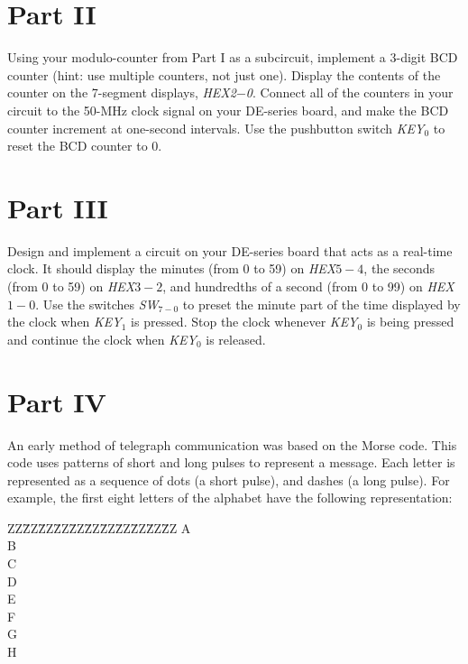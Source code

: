 \documentclass[epsfig,10pt,fullpage]{article}
\begin{document}
\section*{Part II}
Using your modulo-counter from Part I as a subcircuit, 
implement a 3-digit BCD counter (hint: use multiple counters, not just one). Display the 
contents of the counter on the 7-segment displays, {\it HEX2$-$0}. Connect all of the counters 
in your circuit to the 50-MHz clock signal on your DE-series board, and make the BCD counter
increment at one-second intervals.
Use the pushbutton switch {\it KEY}$_0$ to reset the BCD counter to 0.

\section*{Part III}
Design and implement a circuit on your DE-series board that acts as a real-time clock.
It should display the minutes (from 0 to 59) on {\it HEX$5-4$}, the seconds (from 0 to 59)
on {\it HEX$3-2$}, and hundredths of a second (from 0 to 99) on {\it HEX}$1-0$. Use the 
switches {\it SW}$_{7-0}$ to preset the minute 
part of the time displayed by the clock when {\it KEY}$_1$ is pressed.
Stop the clock whenever {\it KEY}$_0$ is being pressed and continue the clock when 
{\it KEY}$_0$ is released.

\section*{Part IV}
An early method of telegraph communication was based on the Morse code. This code uses 
patterns of short and long pulses to represent a message. Each letter is represented as a 
sequence of dots (a short pulse), and dashes (a long pulse). For example, the first eight 
letters of the alphabet have the following representation:

\begin{table}[H]
\begin{center}
\begin{minipage}[t]{12.5 cm}
\begin{tabbing}
ZZ\=ZZ\=ZZ\=ZZ\=ZZ\=ZZ\=ZZ\=ZZ\=ZZ\=ZZ\=ZZ\kill
\>A\>\>{\bf $\bullet$  ---}\\
\>B\>\>{\bf ---  $\bullet$  $\bullet$  $\bullet$}\\
\>C\>\>{\bf ---  $\bullet$  ---  $\bullet$}\\
\>D\>\>{\bf ---  $\bullet$  $\bullet$}\\
\>E\>\>{\bf $\bullet$}\\
\>F\>\>{\bf $\bullet$  $\bullet$  ---  $\bullet$}\\
\>G\>\>{\bf ---  ---  $\bullet$}\\
\>H\>\>{\bf $\bullet$  $\bullet$  $\bullet$  $\bullet$}\\
\end{tabbing}
\end{minipage}
\end{center}
\end{table}
\end{document}
